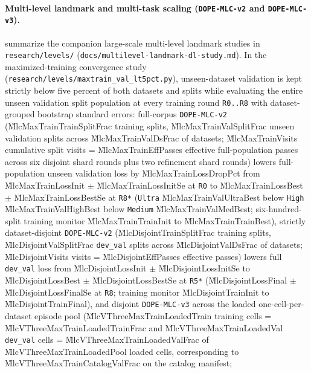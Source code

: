 \paragraph{Multi-level landmark and multi-task scaling (\texttt{DOPE-MLC-v2} and \texttt{DOPE-MLC-v3}).}
 summarize the companion large-scale multi-level landmark studies in
\texttt{research/levels/} (\texttt{docs/\allowbreak multilevel-\allowbreak landmark-\allowbreak dl-\allowbreak study.md}). In the maximized-training
convergence study (\texttt{research/\allowbreak levels/\allowbreak maxtrain\_\allowbreak val\_\allowbreak lt5pct.py}), unseen-dataset validation is
kept strictly below five percent of both datasets and splits while evaluating the entire unseen
validation split population at every training round \texttt{R0..R8} with dataset-grouped bootstrap
standard errors: full-corpus \texttt{DOPE-MLC-v2} (\G{MlcMaxTrainTrainSplitFrac} training splits,
\G{MlcMaxTrainValSplitFrac} unseen validation splits across \G{MlcMaxTrainValDsFrac} of datasets;
\G{MlcMaxTrainVisits} cumulative split visits = \G{MlcMaxTrainEffPasses} effective full-population
passes across six disjoint shard rounds plus two refinement shard rounds) lowers full-population
unseen validation loss by \G{MlcMaxTrainLossDropPct} from \G{MlcMaxTrainLossInit} $\pm$
\G{MlcMaxTrainLossInitSe} at \texttt{R0} to \G{MlcMaxTrainLossBest} $\pm$ \G{MlcMaxTrainLossBestSe} at
\texttt{R8*} (\texttt{Ultra} \G{MlcMaxTrainValUltraBest} below \texttt{High}
\G{MlcMaxTrainValHighBest} below \texttt{Medium} \G{MlcMaxTrainValMedBest}; six-hundred-split training
monitor \G{MlcMaxTrainTrainInit} to \G{MlcMaxTrainTrainBest}), strictly dataset-disjoint
\texttt{DOPE-MLC-v2} (\G{MlcDisjointTrainSplitFrac} training splits, \G{MlcDisjointValSplitFrac}
\texttt{dev\_val} splits across \G{MlcDisjointValDsFrac} of datasets; \G{MlcDisjointVisits} visits =
\G{MlcDisjointEffPasses} effective passes) lowers full \texttt{dev\_val} loss from
\G{MlcDisjointLossInit} $\pm$ \G{MlcDisjointLossInitSe} to \G{MlcDisjointLossBest} $\pm$
\G{MlcDisjointLossBestSe} at \texttt{R5*} (\G{MlcDisjointLossFinal} $\pm$ \G{MlcDisjointLossFinalSe} at
\texttt{R8}; training monitor \G{MlcDisjointTrainInit} to \G{MlcDisjointTrainFinal}), and disjoint
\texttt{DOPE-MLC-v3} across the loaded one-cell-per-dataset episode pool (\G{MlcVThreeMaxTrainLoadedTrain}
training cells = \G{MlcVThreeMaxTrainLoadedTrainFrac} and \G{MlcVThreeMaxTrainLoadedVal}
\texttt{dev\_val} cells = \G{MlcVThreeMaxTrainLoadedValFrac} of \G{MlcVThreeMaxTrainLoadedPool} loaded
cells, corresponding to \G{MlcVThreeMaxTrainCatalogValFrac} on the catalog manifest;
